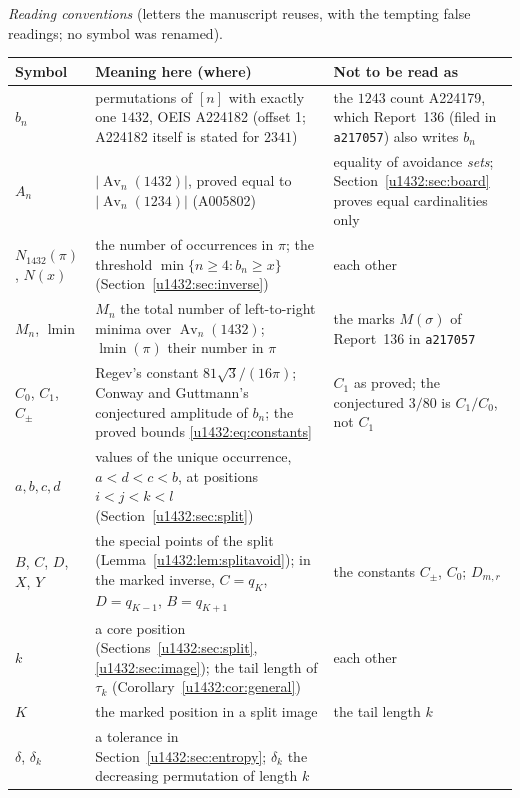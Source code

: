 \documentclass[11pt]{article}
\theoremstyle{remark}\newtheorem{remark}[theorem]{Remark}
\newcommand{\Av}{\operatorname{Av}}
\newcommand{\lm}{\operatorname{lmin}}
\newcommand{\file}[1]{\nolinkurl{#1}}
\begin{document}
\medskip\noindent\begin{minipage}{\textwidth}
\emph{Reading conventions} (letters the manuscript reuses, with the tempting
false readings; no symbol was renamed).

\smallskip
\begingroup\small\renewcommand{\arraystretch}{1.1}
\noindent\begin{tabular}{@{}>{\raggedright\arraybackslash}p{0.75in}>{\raggedright\arraybackslash}p{3.45in}>{\raggedright\arraybackslash}p{1.95in}@{}}
\toprule
Symbol & Meaning here (where) & Not to be read as\\
\midrule
$b_n$ & permutations of $[n]$ with exactly one $1432$, OEIS A224182 (offset
 1; A224182 itself is stated for $2341$) & the $1243$ count A224179, which
 Report~136 (filed in \file{a217057}) also writes $b_n$\\
$A_n$ & $|\Av_n(1432)|$, proved equal to $|\Av_n(1234)|$ (A005802) &
 equality of avoidance \emph{sets}; Section~\ref{u1432:sec:board} proves
 equal cardinalities only\\
$N_{1432}(\pi)$, $N(x)$ & the number of occurrences in $\pi$; the threshold
 $\min\{n\ge4:b_n\ge x\}$ (Section~\ref{u1432:sec:inverse}) & each other\\
$M_n$, $\lm$ & $M_n$ the total number of left-to-right minima over
 $\Av_n(1432)$; $\lm(\pi)$ their number in $\pi$ & the marks $M(\sigma)$ of
 Report~136 in \file{a217057}\\
$C_0$, $C_1$, $C_\pm$ & Regev's constant $81\sqrt3/(16\pi)$; Conway and
 Guttmann's conjectured amplitude of $b_n$; the proved bounds
 \eqref{u1432:eq:constants} & $C_1$ as proved; the conjectured $3/80$ is
 $C_1/C_0$, not $C_1$\\
$a,b,c,d$ & values of the unique occurrence, $a<d<c<b$, at positions
 $i<j<k<l$ (Section~\ref{u1432:sec:split}) & \\
$B$, $C$, $D$, $X$, $Y$ & the special points of the split (Lemma~\ref{u1432:lem:splitavoid});
 in the marked inverse, $C=q_K$, $D=q_{K-1}$, $B=q_{K+1}$ & the constants
 $C_\pm$, $C_0$; $D_{m,r}$\\
$k$ & a core position (Sections~\ref{u1432:sec:split},
 \ref{u1432:sec:image}); the tail length of $\tau_k$
 (Corollary~\ref{u1432:cor:general}) & each other\\
$K$ & the marked position in a split image & the tail length $k$\\
$\delta$, $\delta_k$ & a tolerance in Section~\ref{u1432:sec:entropy};
 $\delta_k$ the decreasing permutation of length $k$ & \\

\end{tabular}
\end{minipage}
\end{document}
